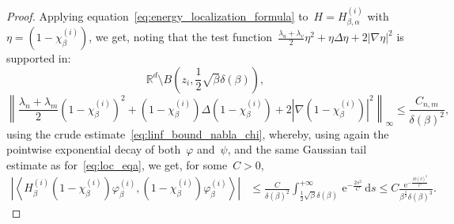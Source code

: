 \documentclass[10pt]{article}
\renewcommand{\d}{\mathrm{d}}
\newcommand{\e}{\mathrm{e}}
\newcommand{\R}{\mathbb{R}}
\newcommand{\1}{\mathbbm 1}
\newcommand{\largeRadius}{\delta}
\begin{document}
\begin{proof}
        Applying equation~\eqref{eq:energy_localization_formula} to~$H = H_{\beta,\alpha}^{(i)}$ with~$\eta = (1-\chi_\beta^{(i)})$, we get, noting that the test function~$\frac{\lambda_u+\lambda_v}2\eta^2+\eta\Delta\eta + 2|\nabla\eta|^2$ is supported in:
        \[\R^d\setminus B\left(z_i,\frac12\sqrt\beta\largeRadius(\beta)\right),\]
        \[\left\|\frac{\lambda_n+\lambda_m}{2}(1-\chi_\beta^{(i)})^2+(1-\chi_\beta^{(i)})\Delta(1-\chi_\beta^{(i)}) + 2|\nabla(1-\chi_\beta^{(i)})|^2\right\|_{\infty}\leq \frac{C_{n,m}}{\largeRadius(\beta)^2},\]
        using the crude estimate~\eqref{eq:linf_bound_nabla_chi}, whereby, using again the pointwise exponential decay of both~$\varphi$ and~$\psi$, and the same Gaussian tail estimate as for~\eqref{eq:loc_eqa}, we get, for some~$C>0$,
        \begin{equation}
            \begin{aligned}
                \left|\left\langle H_\beta^{(i)}(1-\chi_\beta^{(i)})\varphi_\beta^{(i)},(1-\chi_\beta^{(i)})\varphi_\beta^{(i)}\right\rangle \right| &\leq \frac{C}{\largeRadius(\beta)^2}\int_{\frac12\sqrt\beta\largeRadius(\beta)}^{+\infty}\,\e^{-\frac{2s^2}{C}}\,\d s\leq C\frac{\e^{-\frac{\beta\largeRadius(\beta)^2}{C}}}{\beta^{\frac12}\largeRadius(\beta)^3}.
            \end{aligned}
        \end{equation}
    \end{proof}
\end{document}
